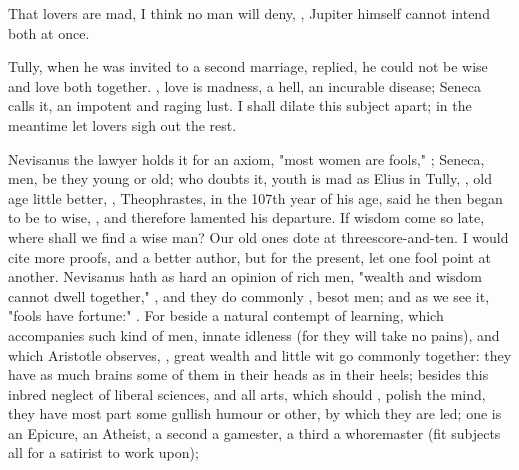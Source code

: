 That lovers are mad, I think no man will deny, , Jupiter himself cannot intend both at
once.


Tully, when he was invited to a second marriage, replied, he could not
 be wise and love both together.
, love is madness, a hell, an incurable disease;  Seneca calls it, an impotent and raging
lust. I shall dilate this subject apart; in the meantime let lovers sigh out
the rest.

Nevisanus the lawyer holds it for an axiom, "most women are
fools," ; Seneca, men, be
they young or old; who doubts it, youth is mad as Elius in Tully, , old age little better, , \etc{} Theophrastes,
in the 107th year of his age, said he then began to be to
wise, , and therefore lamented his departure. If wisdom
come so late, where shall we find a wise man? Our old ones dote at
threescore-and-ten. I would cite more proofs, and a better author, but for the
present, let one fool point at another. Nevisanus hath as
hard an opinion of rich men, "wealth and wisdom cannot
dwell together," , and they
do commonly , besot men; and as
we see it, "fools have fortune:" . For beside a natural contempt of
learning, which accompanies such kind of men, innate idleness (for they will
take no pains), and which Aristotle observes, , great
wealth and little wit go commonly together: they have as much brains some of
them in their heads as in their heels; besides this inbred neglect of liberal
sciences, and all arts, which should , polish the mind,
they have most part some gullish humour or other, by which they are led; one is
an Epicure, an Atheist, a second a gamester, a third a whoremaster (fit
subjects all for a satirist to work upon);

